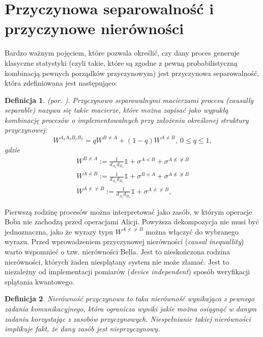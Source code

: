 \documentclass[10pt]{article} %
\newtheorem{definicja}{Definicja}
\newcommand{\WAll}{W^{A_1A_2B_1B_2}}
\newcommand{\I}{\mathbb{1}}
\begin{document}
\section{Przyczynowa separowalność i przyczynowe nierówności}
Bardzo ważnym pojęciem, które pozwala określić, czy dany proces generuje klasyczne statystyki (czyli takie, które są zgodne z pewną probabilistyczną kombinacją pewnych porządków przyczynowym) jest przyczynowa separowalność, która zdefiniowana jest następująco:
\begin{definicja}
(por. \cite{process_matrix}).
Przyczynowo separowalnymi macierzami procesu (\textit{causally separable}) nazywa się takie macierze, które można zapisać jako wypukłą kombinację procesów o implementowalnych przy założeniu określonej struktury przyczynowej:
\begin{equation}
\label{eq:sep}
\WAll = qW^{B \nprec A} + (1-q)W^{A \nprec B},~0 \leq q \leq 1,
\end{equation}
gdzie
\begin{gather}
W^{B \nprec A} := \frac{1}{d_{A_1}d_{B_1}}\I + \sigma^{A \preceq B} + \sigma^{A \npreceq \nsucceq B} \\
W^{A \nprec B} := \frac{1}{d_{A_1}d_{B_1}}\I + \sigma^{B \preceq A} + \sigma^{A \npreceq \nsucceq B} \\
W^{A \nprec \nsucc B} := \frac{1}{d_{A_1}d_{B_1}}\I + \sigma^{A \nprec \nsucc B},
\end{gather}
\end{definicja}
Pierwszą rodzinę procesów można interpretować jako zasób, w którym operacje Boba nie zachodzą przed operacjami Alicji.
Powyższa dekompozycja nie musi być jednoznaczna, jako że wyrazy typu $W^{A \nprec \nsucc B}$ można włączyć do wybranego wyrazu.
Przed wprowadzeniem przyczynowej nierówności (\textit{causal inequallity}) warto wspomnieć o tzw. nierówności Bella. Jest to nieskończona rodzina nierówności, których żaden niesplątany system nie może złamać. Jest to niezależny od implementacji pomiarów (\textit{device independent}) sposób weryfikacji splątania kwantowego. 
\begin{definicja}
Nierówność przyczynowa to taka nierówność wynikająca z pewnego zadania komunikacyjnego, która ogranicza wyniki jakie można osiągnąć w danym zadaniu korzystając z zasobów przyczynowych. Niespełnianie takiej nierówności implikuje fakt, że dany zasób jest nieprzyczynowy.
\end{definicja}
\end{document}
